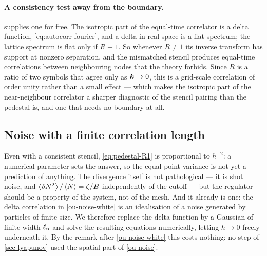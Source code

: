 \documentclass[a5paper]{article}
\begin{document}
\paragraph{A consistency test away from the boundary.}  supplies one for free. The isotropic part of the equal-time correlator is a delta function, \eqref{eq:autocorr-fourier}, and a delta in real space is a flat spectrum; the lattice spectrum is flat only if $R\equiv1$. So whenever $R\neq1$ its inverse transform has support at nonzero separation, and the mismatched stencil produces equal-time correlations between neighbouring nodes that the theory forbids. Since $R$ is a ratio of two symbols that agree only as $\boldsymbol{k}\to0$, this is a grid-scale correlation of order unity rather than a small effect --- which makes the isotropic part of the near-neighbour correlator a sharper diagnostic of the stencil pairing than the pedestal is, and one that needs no boundary at all.


\subsection{Noise with a finite correlation length}
\label{sec-noise-cutoff}

Even with a consistent stencil, \eqref{eq:pedestal-R1} is proportional to $h^{-2}$: a numerical parameter sets the answer, so the equal-point variance is not yet a prediction of anything. The divergence itself is not pathological --- it is shot noise, and $\left\langle\delta N^2\right\rangle/\left\langle N\right\rangle = \zeta/B$ independently of the cutoff --- but the regulator should be a property of the system, not of the mesh. And it already is one: the delta correlation in \eqref{ou-noise-white} is an idealisation of a noise generated by particles of finite size. We therefore replace the delta function by a Gaussian of finite width $\ell_{\rm n}$ and solve the resulting equations numerically, letting $h\to0$ freely underneath it. By the remark after \eqref{ou-noise-white} this costs nothing: no step of \cref{sec-lyapunov} used the spatial part of \eqref{ou-noise}.
\end{document}
